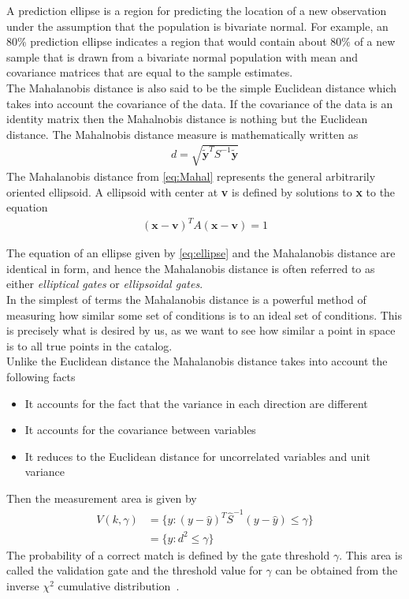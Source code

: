 \documentclass[]{aiaa-tc}%
\begin{document}
A prediction ellipse is a region for predicting the location of a new observation under the assumption that the population is bivariate normal. For example, an $80\%$ prediction ellipse indicates a region that would contain about $80\%$ of a new sample that is drawn from a bivariate normal population with mean and covariance matrices that are equal to the sample estimates.\\

The Mahalanobis distance is also said to be the simple Euclidean distance which takes into account the covariance of the data. If the covariance of the data is an identity matrix then the Mahalnobis distance is nothing but the Euclidean distance. The Mahalnobis distance measure is mathematically written as
\begin{align}
\label{eq:Mahal}
d = \sqrt{\tilde{\textbf{y}}^TS^{-1}\tilde{\textbf{y}}}
\end{align}
The Mahalanobis distance from \eqref{eq:Mahal} represents the general arbitrarily oriented ellipsoid. A ellipsoid with center at \textbf{v} is defined by solutions to \textbf{x} to the equation
\begin{align}
\label{eq:ellipse}
(\textbf{x}-\textbf{v})^{T}A(\textbf{x}-\textbf{v})  = 1
\end{align}

The equation of an ellipse given by \ref{eq:ellipse} and the Mahalanobis distance are identical in form, and hence the Mahalanobis distance is often referred to as either \textit{elliptical gates} or \textit{ellipsoidal gates}.\\

In the simplest of terms the Mahalanobis distance is a powerful method of measuring how similar some set of conditions is to an ideal set of conditions. This is precisely what is desired by us, as we want to see how similar a point in space is to all true points in the catalog.\\

Unlike the Euclidean distance the Mahalanobis distance takes into account the following facts \cite{giorgio_grisetti_robotics}
\begin{itemize}

\item It accounts for the fact that the variance in each direction are different

\item It accounts for the covariance between variables

\item It reduces to the Euclidean distance for uncorrelated variables and unit variance
\end{itemize}
Then the measurement area is given by
\begin{align*}
V(k,\gamma) &=  \lbrace y: (y-\hat{y})^T\hat{S}^{-1}(y - \hat{y}) \leq \gamma\rbrace \\
&=\lbrace y : d^2 \leq \gamma \rbrace
\end{align*}
The probability of a correct match is defined by the gate threshold $\gamma$. This area is called the validation gate and the threshold value for $\gamma$ can be obtained from the inverse $\chi^2$ cumulative distribution~\cite{giorgio_grisetti_robotics}.\\
\end{document}
